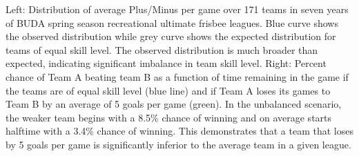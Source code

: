 Left: Distribution of average Plus/Minus per game over 171 teams in seven years of BUDA spring season recreational ultimate frisbee leagues.  Blue curve shows the observed distribution while grey curve shows the expected distribution for teams of equal skill level. The observed distribution is much broader than expected, indicating significant imbalance in team skill level. Right: Percent chance of Team A beating team B as a function of time remaining in the game if the teams are of equal skill level (blue line) and if Team A loses its games to Team B by an average of 5 goals per game (green). In the unbalanced scenario, the weaker team begins with a 8.5\% chance of winning and on average starts halftime with a 3.4\% chance of winning. This demonstrates that a team that loses by 5 goals per game is significantly inferior to the average team in a given league. \label{fig:buda_performance}